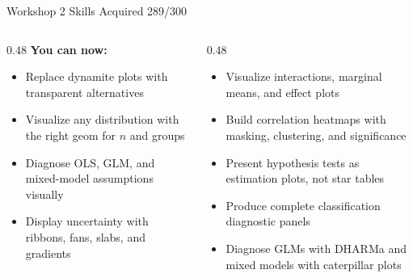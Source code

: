 \documentclass[10pt]{beamer}
\newcommand{\smark}[1]{\hfill{\scriptsize\color{codegray}#1}}
\begin{document}
\begin{frame}{Workshop 2 Skills Acquired}
\smark{289/300}
\begin{columns}[T]
\begin{column}{0.48\textwidth}
    \textbf{You can now:}
    \begin{itemize}
        \item Replace dynamite plots with transparent alternatives
        \item Visualize any distribution with the right geom for $n$ and groups
        \item Diagnose OLS, GLM, and mixed-model assumptions visually
        \item Display uncertainty with ribbons, fans, slabs, and gradients
    \end{itemize}
\end{column}
\begin{column}{0.48\textwidth}
    \begin{itemize}
        \item Visualize interactions, marginal means, and effect plots
        \item Build correlation heatmaps with masking, clustering, and significance
        \item Present hypothesis tests as estimation plots, not star tables
        \item Produce complete classification diagnostic panels
        \item Diagnose GLMs with DHARMa and mixed models with caterpillar plots
    \end{itemize}
\end{column}
\end{columns}
\end{frame}
\end{document}
